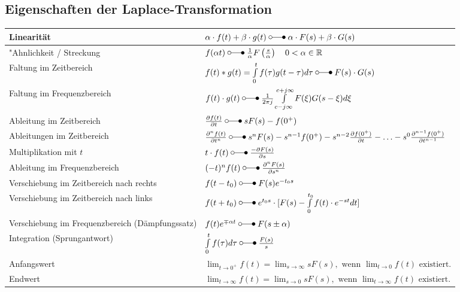  	\subsection{Eigenschaften der Laplace-Transformation}
  		\renewcommand{\arraystretch}{2}
		\begin{tabular}{|l|l|}
        	\hline
        	Linearität & 
 			$\alpha\cdot f(t) + \beta\cdot g(t) \; \laplace \; \alpha\cdot F(s) + \beta\cdot
 			G(s)$ \\
 			\hline
 			"Ahnlichkeit / Streckung &
 			$f(\alpha t) \; \laplace \; \frac{1}{\alpha}F \left (\frac{s}{\alpha} \right ) \quad 0
 			<\alpha \in\mathbb{R}$ \\
 			\hline
 			Faltung im Zeitbereich &
 			$f(t) \ast g(t) = \int\limits_{0}^{t} f(\tau)g(t-\tau)d\tau \; \laplace \; F(s)
 			\cdot G(s)$\\
 			\hline
 			Faltung im Frequenzbereich &
 			$f(t) \cdot g(t) \; \laplace \; \frac{1}{2\pi j}\int\limits_{c-j\infty}^{c+j\infty}
 			F(\xi) G(s-\xi)d\xi$ \\
 			\hline
 			Ableitung im Zeitbereich &
 			$\frac{\partial f(t)}{\partial t} \; \laplace \; sF(s)
 			-f(0^+)$ \\
 			\hline
 			Ableitungen im Zeitbereich &
 			$\frac{\partial^n f(t)}{\partial t^n} \; \laplace \; s^nF(s)
 			-s^{n-1}f(0^+)-s^{n-2}\frac{\partial f(0^+)}{\partial t}-\ldots
 			-s^0\frac{\partial^{n-1} f(0^+)}{\partial t^{n-1}}$ \\
 			\hline
 			Multiplikation mit $t$ &
 			$t\cdot f(t)  \; \laplace \; \frac{-\partial F(s)}{\partial s}$ \\
 			\hline
 			Ableitung im Frequenzbereich &
 			$(-t)^n f(t) \; \laplace \;  \frac{\partial^n F(s)}{\partial s^n}$ \\
 			\hline
 			Verschiebung im Zeitbereich nach rechts &
 			$f(t - t_0) \; \laplace \; F(s)e^{- t_0 s}$ \\
 			\hline
			Verschiebung im Zeitbereich nach links &
			$f(t + t_0) \; \laplace \; e^{t_0 s} \cdot [F(s) - \int\limits_0^{t_0} f(t) \cdot e^{-st} dt]$\\
			\hline
 			Verschiebung im Frequenzbereich (Dämpfungssatz) &
 			$f(t)e^{\mp\alpha t} \; \laplace \; F(s\pm\alpha)$ \\
 			\hline
 			Integration (Sprungantwort)&
 			$\int\limits_0^t f(\tau)d\tau \; \laplace \; \frac{F(s)}{s}$ \\
 			\hline
 			Anfangswert &
 			$\lim_{t\rightarrow 0^+} f(t) = \lim_{s\rightarrow \infty} sF(s),\text{~wenn
 			}  \lim_{t\rightarrow 0} f(t)\text{~existiert}.$ \\
 			\hline
 			Endwert &
 			$\lim_{t\rightarrow \infty} f(t) = \lim_{s\rightarrow 0} sF(s),\text{~wenn
 			}  \lim_{t\rightarrow \infty} f(t)\text{~existiert}.$ \\
 			\hline
       	\end{tabular}
		\renewcommand{\arraystretch}{\arraystretchOriginal}
	
